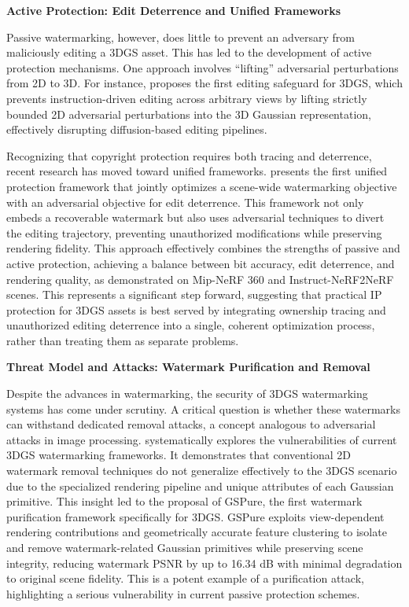 \documentclass[11pt]{article}
\begin{document}
\textbf{Active Protection: Edit Deterrence and Unified Frameworks}

Passive watermarking, however, does little to prevent an adversary from maliciously editing a 3DGS asset. This has led to the development of active protection mechanisms. One approach involves ``lifting'' adversarial perturbations from 2D to 3D. For instance, \cite{ref728} proposes the first editing safeguard for 3DGS, which prevents instruction-driven editing across arbitrary views by lifting strictly bounded 2D adversarial perturbations into the 3D Gaussian representation, effectively disrupting diffusion-based editing pipelines.

Recognizing that copyright protection requires both tracing and deterrence, recent research has moved toward unified frameworks. \cite{ref729} presents the first unified protection framework that jointly optimizes a scene-wide watermarking objective with an adversarial objective for edit deterrence. This framework not only embeds a recoverable watermark but also uses adversarial techniques to divert the editing trajectory, preventing unauthorized modifications while preserving rendering fidelity. This approach effectively combines the strengths of passive and active protection, achieving a balance between bit accuracy, edit deterrence, and rendering quality, as demonstrated on Mip-NeRF 360 and Instruct-NeRF2NeRF scenes. This represents a significant step forward, suggesting that practical IP protection for 3DGS assets is best served by integrating ownership tracing and unauthorized editing deterrence into a single, coherent optimization process, rather than treating them as separate problems.

\textbf{Threat Model and Attacks: Watermark Purification and Removal}

Despite the advances in watermarking, the security of 3DGS watermarking systems has come under scrutiny. A critical question is whether these watermarks can withstand dedicated removal attacks, a concept analogous to adversarial attacks in image processing. \cite{ref730} systematically explores the vulnerabilities of current 3DGS watermarking frameworks. It demonstrates that conventional 2D watermark removal techniques do not generalize effectively to the 3DGS scenario due to the specialized rendering pipeline and unique attributes of each Gaussian primitive. This insight led to the proposal of GSPure, the first watermark purification framework specifically for 3DGS. GSPure exploits view-dependent rendering contributions and geometrically accurate feature clustering to isolate and remove watermark-related Gaussian primitives while preserving scene integrity, reducing watermark PSNR by up to 16.34 dB with minimal degradation to original scene fidelity. This is a potent example of a purification attack, highlighting a serious vulnerability in current passive protection schemes.
\end{document}
